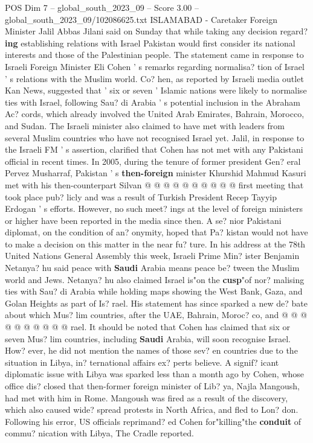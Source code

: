 \begin{textsample}{POS Dim 7 – global\_south\_2023\_09 – Score 3.00 – global\_south\_2023\_09/102086625.txt}  \label{ex:f7_pos_004}
ISLAMABAD - Caretaker Foreign Minister Jalil Abbas Jilani said on Sunday that while taking any decision regard? \textbf{ing} establishing relations with Israel Pakistan would first consider its national interests and those of the Palestinian people.
The statement came in response to Israeli Foreign Minister Eli Cohen ' s remarks regarding normalisa? tion of Israel ' s relations with the Muslim world.
Co? hen, as reported by Israeli media outlet Kan News, suggested that ' six or seven ' Islamic nations were likely to normalise ties with Israel, following Sau? di Arabia ' s potential inclusion in the Abraham Ac? cords, which already involved the United Arab Emirates, Bahrain, Morocco, and Sudan.
The Israeli minister also claimed to have met with leaders from several Muslim countries who have not recognised Israel yet.
Jalil, in response to the Israeli FM ' s assertion, clarified that Cohen has not met with any Pakistani official in recent times.
In 2005, during the tenure of former president Gen? eral Pervez Musharraf, Pakistan ' s \textbf{then-foreign} minister Khurshid Mahmud Kasuri met with his then-counterpart Silvan @ @ @ @ @ @ @ @ @ @ first meeting that took place pub? licly and was a result of Turkish President Recep Tayyip Erdogan ' s efforts.
However, no such meet? ings at the level of foreign ministers or higher have been reported in the media since then.
A se? nior Pakistani diplomat, on the condition of an? onymity, hoped that Pa? kistan would not have to make a decision on this matter in the near fu? ture.
In his address at the 78th United Nations General Assembly this week, Israeli Prime Min? ister Benjamin Netanya? hu said peace with \textbf{Saudi} Arabia means peace be? tween the Muslim world and Jews.
Netanya? hu also claimed Israel is"on the \textbf{cusp}"of nor? malising ties with Sau? di Arabia while holding maps showing the West Bank, Gaza, and Golan Heights as part of Is? rael.
His statement has since sparked a new de? bate about which Mus? lim countries, after the UAE, Bahrain, Moroc? co, and @ @ @ @ @ @ @ @ @ @ rael.
It should be noted that Cohen has claimed that six or seven Mus? lim countries, including \textbf{Saudi} Arabia, will soon recognise Israel.
How? ever, he did not mention the names of those sev? en countries due to the situation in Libya, in? ternational affairs ex? perts believe.
A signif? icant diplomatic issue with Libya was sparked less than a month ago by Cohen, whose office dis? closed that then-former foreign minister of Lib? ya, Najla Mangoush, had met with him in Rome.
Mangoush was fired as a result of the discovery, which also caused wide? spread protests in North Africa, and fled to Lon? don.
Following his error, US officials reprimand? ed Cohen for"killing"the \textbf{conduit} of commu? nication with Libya, The Cradle reported.

\end{textsample}
